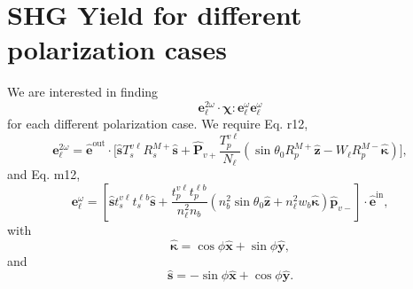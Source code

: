 \documentclass{article}
\begin{document}
\section{SHG Yield for different polarization cases}

We are interested in finding
\begin{equation*}
\mathbf{e}^{2\omega}_{\ell}\cdot\boldsymbol{\chi}:
\mathbf{e}^{\omega}_{\ell}\mathbf{e}^{\omega}_{\ell}
\end{equation*}
for each different polarization case. We require Eq. r12,
\begin{equation}\label{eq:e2well}
\mathbf{e}^{2\omega}_{\ell} = \hat{\mathbf{e}}^{\mathrm{out}}\cdot
\Bigg[
\hat{\mathbf{s}}T_{s}^{v\ell}R^{M+}_{s}\hat{\mathbf{s}} + 
\hat{\mathbf{P}}_{v+}\frac{T^{v\ell}_{p}}{N_{\ell}}
\left(
\sin\theta_{0}R^{M+}_{p}\hat{\mathbf{z}} 
- W_{\ell}R^{M-}_{p}\hat{\boldsymbol{\kappa}}
\right)
\Bigg],
\end{equation}
and Eq. m12, %
\begin{equation}\label{eq:ewell}
\mathbf{e}^{\omega}_{\ell} = 
\left[
\hat{\mathbf{s}}t_{s}^{v\ell}t_{s}^{\ell b}\hat{\mathbf{s}} 
+ \frac{t^{v\ell}_{p}t^{\ell b}_{p}}{n^{2}_{\ell}n_{b}}
\left(
  n^{2}_{b}\sin\theta_{0}\hat{\mathbf{z}} 
+ n^{2}_{\ell}w_{b}\hat{\boldsymbol{\kappa}}
\right)
\hat{\mathbf{p}}_{v-}
\right]
\cdot\hat{\mathbf{e}}^{\mathrm{in}},
\end{equation}
with
\begin{equation}\label{eq:kappa}
\hat{\boldsymbol{\kappa}}
= \cos\phi\hat{\mathbf{x}} + \sin\phi\hat{\mathbf{y}},
\end{equation}
and
\begin{equation}\label{eq:svector}
\hat{\mathbf{s}} = -\sin\phi\hat{\mathbf{x}} + \cos\phi\hat{\mathbf{y}}.
\end{equation}
\end{document}

